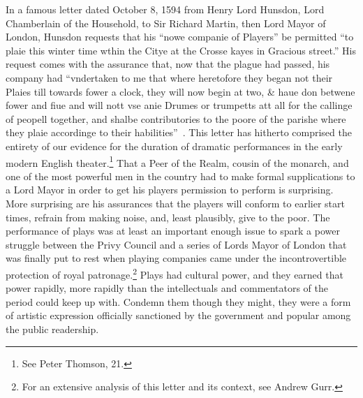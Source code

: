 In a famous letter dated October 8, 1594 from Henry Lord Hunsdon, Lord Chamberlain of the Household, to Sir Richard Martin, then Lord Mayor of London, Hunsdon requests that his ``nowe companie of Players'' be permitted ``to plaie this winter time wthin the Citye at the Crosse kayes in Gracious street.'' His request comes with the assurance that, now that the plague had passed, his company had ``vndertaken to me that where heretofore they began not their Plaies till towards fower a clock, they will now begin at two, \& haue don betwene fower and fiue and will nott vse anie Drumes or trumpetts att all for the callinge of peopell together, and shalbe contributories to the poore of the parishe where they plaie accordinge to their habilities''~\cite[73--74]{malone_society_collections:_1907}.
This letter has hitherto comprised the entirety of our evidence for the duration of dramatic performances in the early modern English theater.\footnote{See Peter Thomson, 21.\nocite{thomson_shakespeares_1992}} That a Peer of the Realm, cousin of the monarch, and one of the most powerful men in the country had to make formal supplications to a Lord Mayor in order to get his players permission to perform is surprising. More surprising are his assurances that the players will conform to earlier start times, refrain from making noise, and, least plausibly, give to the poor. The performance of plays was at least an important enough issue to spark a power struggle between the Privy Council and a series of Lords Mayor of London that was finally put to rest when playing companies came under the incontrovertible protection of royal patronage.\footnote{For an extensive analysis of this letter and its context, see Andrew Gurr.\nocite{gurr_henry_2005}} Plays had cultural power, and they earned that power rapidly, more rapidly than the intellectuals and commentators of the period could keep up with. Condemn them though they might, they were a form of artistic expression officially sanctioned by the government and popular among the public readership.

